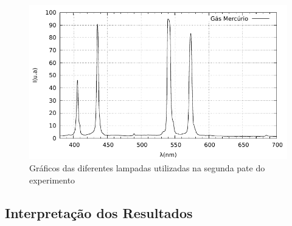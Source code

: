 \begin{figure}[!htb]
		\includegraphics[scale= 0.6]{fig/Mercurio.pdf}
	
	\caption{Gráficos das diferentes lampadas utilizadas na segunda pate do experimento}
	\label{fig:Gas}
\end{figure}

\subsection{Interpretação dos Resultados}

